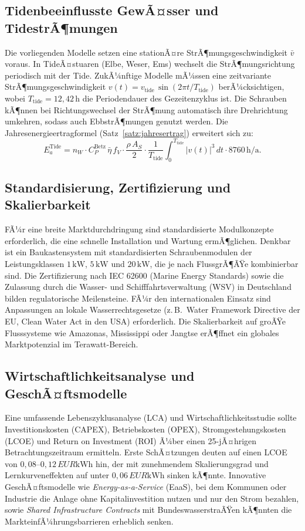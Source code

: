 ﻿\documentclass[a4paper,12pt]{article}
\theoremstyle{definition}
\begin{document}
\subsection{Tidenbeeinflusste GewÃ¤sser und TidestrÃ¶mungen}

Die vorliegenden Modelle setzen eine stationÃ¤re StrÃ¶mungsgeschwindigkeit $\bar{v}$
voraus. In TideÃ¤stuaren (Elbe, Weser, Ems) wechselt die StrÃ¶mungsrichtung periodisch
mit der Tide. ZukÃ¼nftige Modelle mÃ¼ssen eine zeitvariante StrÃ¶mungsgeschwindigkeit
$v(t) = v_{\mathrm{tide}}\,\sin(2\pi t/T_{\mathrm{tide}})$ berÃ¼cksichtigen, wobei
$T_{\mathrm{tide}} = 12{,}42\,\mathrm{h}$ die Periodendauer des Gezeitenzyklus ist.
Die Schrauben kÃ¶nnen bei Richtungswechsel der StrÃ¶mung automatisch ihre Drehrichtung
umkehren, sodass auch EbbstrÃ¶mungen genutzt werden. Die Jahresenergieertragformel
(Satz~\ref{satz:jahresertrag}) erweitert sich zu:
\[
  E_a^{\mathrm{Tide}} = n_W \cdot C_P^{\mathrm{Betz}}\,\bar{\eta}\,f_V \cdot
  \frac{\rho\,A_S}{2} \cdot \frac{1}{T_{\mathrm{tide}}}\int_0^{T_{\mathrm{tide}}}
  \bigl|v(t)\bigr|^3\,dt \cdot 8760\,\mathrm{h/a}.
\]

\subsection{Standardisierung, Zertifizierung und Skalierbarkeit}

FÃ¼r eine breite Marktdurchdringung sind standardisierte Modulkonzepte erforderlich,
die eine schnelle Installation und Wartung ermÃ¶glichen. Denkbar ist ein Baukastensystem
mit standardisierten Schraubenmodulen der Leistungsklassen $1\,\mathrm{kW}$,
$5\,\mathrm{kW}$ und $20\,\mathrm{kW}$, die je nach FlussgrÃ¶ÃŸe kombinierbar sind.
Die Zertifizierung nach IEC 62600 (Marine Energy Standards) sowie die Zulassung
durch die Wasser- und Schifffahrtsverwaltung (WSV) in Deutschland bilden regulatorische
Meilensteine. FÃ¼r den internationalen Einsatz sind Anpassungen an lokale
Wasserrechtsgesetze (z.\,B.\ Water Framework Directive der EU, Clean Water Act in
den USA) erforderlich. Die Skalierbarkeit auf groÃŸe Flusssysteme wie Amazonas,
Mississippi oder Jangtse erÃ¶ffnet ein globales Marktpotenzial im Terawatt-Bereich.

\subsection{Wirtschaftlichkeitsanalyse und GeschÃ¤ftsmodelle}

Eine umfassende Lebenszyklusanalyse (LCA) und Wirtschaftlichkeitsstudie sollte
Investitionskosten (CAPEX), Betriebskosten (OPEX), Stromgestehungskosten (LCOE)
und Return on Investment (ROI) Ã¼ber einen 25-jÃ¤hrigen Betrachtungszeitraum ermitteln.
Erste SchÃ¤tzungen deuten auf einen LCOE von $0{,}08$--$0{,}12\,EUR\mathrm{kWh}$
hin, der mit zunehmendem Skalierungsgrad und Lernkurveneffekten auf unter
$0{,}06\,EUR\mathrm{kWh}$ sinken kÃ¶nnte. Innovative GeschÃ¤ftsmodelle wie
\emph{Energy-as-a-Service} (EaaS), bei dem Kommunen oder Industrie die Anlage
ohne Kapitalinvestition nutzen und nur den Strom bezahlen, sowie
\emph{Shared Infrastructure Contracts} mit BundeswasserstraÃŸen kÃ¶nnten die
MarkteinfÃ¼hrungsbarrieren erheblich senken.
\end{document}
